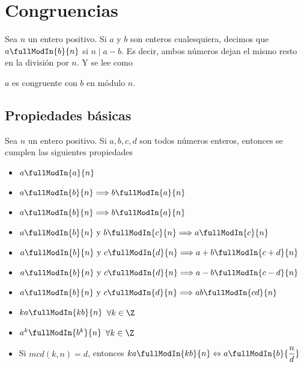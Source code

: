 \section{Congruencias}
\vspace{-4mm}

\begin{definition}
    Sea $n$ un entero positivo.
    Si $a$ y $b$ son enteros cualesquiera, decimos que $a \fullModIn{b}{n}$ si $n \mid a - b$.
    Es decir, ambos números dejan el mismo resto en la división por $n$.
    Y se lee como
    \vspace{-2mm}
    \begin{center}
        $a$ es congruente con $b$ en módulo $n$.
    \end{center}
\end{definition}

\subsection{Propiedades básicas}
Sea $n$ un entero positivo.
Si $a, b, c, d$ son todos números enteros, entonces se cumplen las siguientes propiedades
\begin{itemize}
    \item $a \fullModIn{a}{n}$
    \item $a \fullModIn{b}{n} \Longrightarrow b \fullModIn{a}{n}$
    \item $a \fullModIn{b}{n} \Longrightarrow b \fullModIn{a}{n}$
    \item $a \fullModIn{b}{n} \mbox{ y } b \fullModIn{c}{n} \Longrightarrow a \fullModIn{c}{n}$
    \item $a \fullModIn{b}{n} \mbox{ y } c \fullModIn{d}{n} \Longrightarrow a + b \fullModIn{c + d}{n}$
    \item $a \fullModIn{b}{n} \mbox{ y } c \fullModIn{d}{n} \Longrightarrow a - b \fullModIn{c - d}{n}$
    \item $a \fullModIn{b}{n} \mbox{ y } c \fullModIn{d}{n} \Longrightarrow ab \fullModIn{cd}{n}$
    \item $ka \fullModIn{kb}{n}$ $\forall k \in \Z$
    \item $a^k \fullModIn{b^k}{n}$ $\forall k \in \Z$
    \item Si $mcd(k, n) =  d$, entonces $ka \fullModIn{kb}{n} \Leftrightarrow a \fullModIn{b}{\dfrac{n}{d}}$
\end{itemize}


